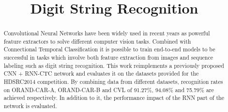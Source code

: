 \documentclass[a4paper]{article}
\title{Digit String Recognition}
\begin{document}
\maketitle
%
\begin{abstract} \label{sec:abstract}
Convolutional Neural Networks have been widely used in recent years as powerful feature extractors to solve different computer vision tasks. Combined with Connectional Temporal Classification it is possible to train end-to-end models to be successful in tasks which involve both feature extraction from images and sequence labeling such as digit string recognition. This work reimplements a previously proposed CNN + RNN-CTC network and evaluates it on the datasets provided for the HDSRC2014 competition. By combining data from different datasets, recognition rates on ORAND-CAR-A, ORAND-CAR-B and CVL of 91.27\%, 94.08\% and 75.79\% are achieved respectively. In addition to it, the performance impact of the RNN part of the network is evaluated. 

\end{abstract}


%








%


%

\end{document}
